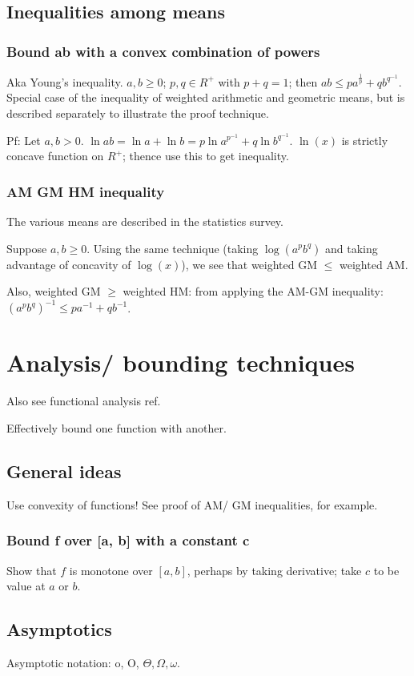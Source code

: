 \documentclass[oneside, article]{memoir}
\begin{document}
\section{Inequalities among means}
\subsection{Bound ab with a convex combination of powers}
Aka Young's inequality. $a, b \geq 0$; $p, q \in R^{+}$ with $p + q = 1$; then $ab \leq pa^{\frac{1}{p}} + qb^{q^{-1}}$. Special case of the inequality of weighted arithmetic and geometric means, but is described separately to illustrate the proof technique.

Pf: Let $a, b >0$. $\ln ab = \ln a + \ln b = p\ln a^{p^{-1}} + q\ln b^{q^{-1}}$. $\ln(x)$ is strictly concave function on $R^{+}$; thence use this to get inequality.

\subsection{AM GM HM inequality}
The various means are described in the statistics survey.

Suppose $a, b \geq 0$. Using the same technique (taking $\log(a^{p}b^{q})$ and taking advantage of concavity of $\log(x)$), we see that weighted GM $\leq$ weighted AM.

Also, weighted GM $\geq$ weighted HM: from applying the AM-GM inequality: $(a^p b^q)^{-1} \leq pa^{-1} + qb^{-1}$.

\chapter{Analysis/ bounding techniques}
Also see functional analysis ref.

Effectively bound one function with another.

\section{General ideas}
Use convexity of functions! See proof of AM/ GM inequalities, for example.

\subsection{Bound f over [a, b] with a constant c}
Show that $f$ is monotone over $[a, b]$, perhaps by taking derivative; take $c$ to be value at $a$ or $b$.

\section{Asymptotics}
Asymptotic notation: o, O, $\Theta, \Omega, \omega$.
\end{document}
